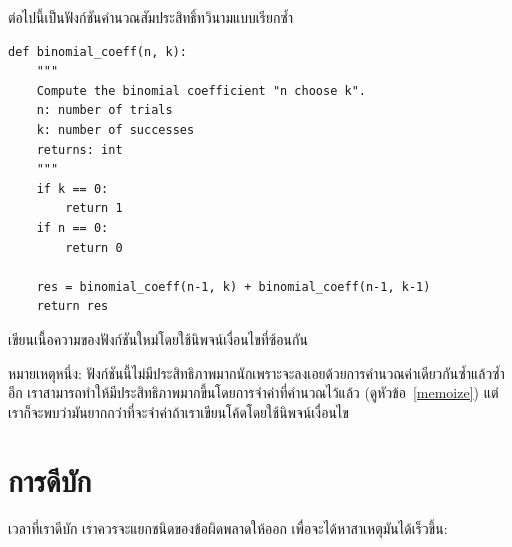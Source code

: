 \begin{exercise}

ต่อไปนี้เป็นฟังก์ชันคำนวณสัมประสิทธิ์ทวินามแบบเรียกซ้ำ

\begin{verbatim}
def binomial_coeff(n, k):
    """
    Compute the binomial coefficient "n choose k".
    n: number of trials
    k: number of successes
    returns: int
    """
    if k == 0:
        return 1
    if n == 0:
        return 0

    res = binomial_coeff(n-1, k) + binomial_coeff(n-1, k-1)
    return res
\end{verbatim}

เขียนเนื้อความของฟังก์ชันใหม่โดยใช้นิพจน์เงื่อนไขที่ซ้อนกัน

หมายเหตุหนึ่ง: ฟังก์ชันนี้ไม่มีประสิทธิภาพมากนักเพราะจะลงเอยด้วยการคำนวณค่าเดียวกันซ้ำแล้วซ้ำอีก เราสามารถทำให้มีประสิทธิภาพมากขึ้นโดยการจำค่าที่คำนวณไว้แล้ว (ดูหัวข้อ~\ref{memoize}) 
แต่เราก็จะพบว่ามันยากกว่าที่จะจำค่าถ้าเราเขียนโค้ดโดยใช้นิพจน์เงื่อนไข
\end{exercise}

\appendix

\chapter{การดีบัก}


เวลาที่เราดีบัก
เราควรจะแยกชนิดของข้อผิดพลาดให้ออก
เพื่อจะได้หาสาเหตุมันได้เร็วขึ้น:

